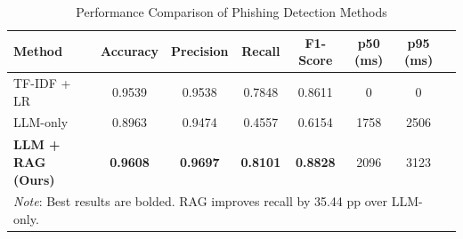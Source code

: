 
\begin{table}[t]
\centering
\caption{Performance Comparison of Phishing Detection Methods}
\label{tab:performance}
\begin{tabular}{lccccccc}
\toprule
Method & Accuracy & Precision & Recall & F1-Score & p50 (ms) & p95 (ms) \\
\midrule
TF-IDF + LR      & 0.9539 & 0.9538 & 0.7848 & 0.8611 & 0    & 0 \\
LLM-only         & 0.8963 & 0.9474 & 0.4557 & 0.6154 & 1758 & 2506 \\
\textbf{LLM + RAG (Ours)} & \textbf{0.9608} & \textbf{0.9697} & \textbf{0.8101} & \textbf{0.8828} & 2096 & 3123 \\
\midrule
\multicolumn{7}{l}{\footnotesize \textit{Note}: Best results are bolded. RAG improves recall by 35.44 pp over LLM-only.} \\
\bottomrule
\end{tabular}
\end{table}
